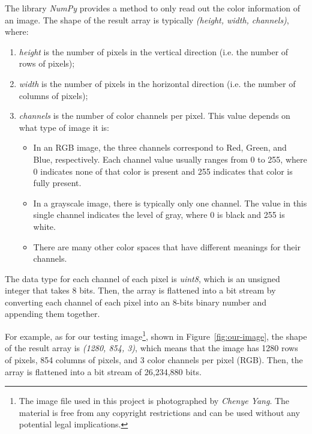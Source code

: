 \documentclass{article}
\begin{document}
The library \textit{NumPy} provides a method to only read out the color information of an image. The shape of the result array is typically \textit{(height, width, channels)}, where:
\begin{enumerate}
    \item \textit{height} is the number of pixels in the vertical direction (i.e. the number of rows of pixels);
    \item \textit{width} is the number of pixels in the horizontal direction (i.e. the number of columns of pixels);
    \item \textit{channels} is the number of color channels per pixel. This value depends on what type of image it is: \begin{itemize}
        \item In an RGB image, the three channels correspond to Red, Green, and Blue, respectively. Each channel value usually ranges from 0 to 255, where 0 indicates none of that color is present and 255 indicates that color is fully present.
        \item In a grayscale image, there is typically only one channel. The value in this single channel indicates the level of gray, where 0 is black and 255 is white.
        \item There are many other color spaces that have different meanings for their channels.
    \end{itemize}
\end{enumerate}
The data type for each channel of each pixel is \textit{uint8}, which is an unsigned integer that takes 8 bits.
Then, the array is flattened into a bit stream by converting each channel of each pixel into an 8-bits binary number and appending them together.

For example, as for our testing image\footnote{The image file used in this project is photographed by \textit{Chenye Yang}. The material is free from any copyright restrictions and can be used without any potential legal implications.}, shown in Figure~\ref{fig:our-image}, the shape of the result array is \textit{(1280, 854, 3)}, which means that the image has 1280 rows of pixels, 854 columns of pixels, and 3 color channels per pixel (RGB). 
Then, the array is flattened into a bit stream of 26,234,880 bits.
\end{document}
